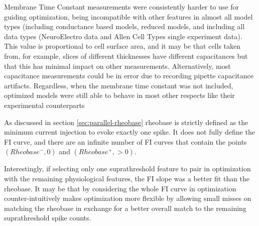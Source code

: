 




Membrane Time Constant measurements were consistently harder to use for guiding optimization, being incompatible with other features in almost all model types (including conductance based models, reduced models, and including all data types (NeuroElectro data and Allen Cell Types single experiment data).
This value is proportional to cell surface area, and it may be that cells taken from, for example, slices of different thicknesses have different capacitances but that this has minimal impact on other measurements.
Alternatively, most capacitance measurements could be in error due to recording pipette capacitance artifacts.
Regardless, when the membrane time constant was not included, optimized models were still able to behave in most other respects like their experimental counterparts

As discussed in section \ref{sec:parallel-rheobase} rheobase is strictly defined as the minimum current injection to evoke exactly one spike.
It does not fully define the FI curve, and there are an infinite number of FI curves that contain the points $(Rheobase^-, 0)$ and $(Rheobase^+, >0)$.

%

Interestingly, if selecting only one suprathreshold feature to pair in optimization with the remaining physiological features, the FI slope was a better fit than the rheobase.
It may be that by considering the whole FI curve in optimization counter-intuitively makes optimization more flexible by allowing small misses on matching the rheobase in exchange for a better overall match to the remaining suprathreshold spike counts.

